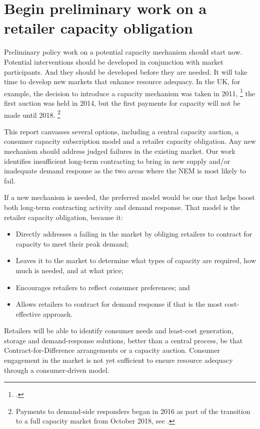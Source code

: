 \documentclass[FrontPage]{grattan}
\begin{document}
\section{Begin preliminary work on a retailer capacity obligation}\label{sec:the-preferred-model-a-retailer-capacity-obligation} 
Preliminary policy work on a potential capacity mechanism should start now. Potential interventions should be developed in conjunction with market participants. And they should be developed before they are needed. It will take time to develop new markets that enhance resource adequacy. In the UK, for example, the decision to introduce a capacity mechanism was taken in 2011,%
\footcite{UK2011DECCWhitePaper}
the first auction was held in 2014, but the first payments for capacity will not be made until 2018.%
\footnote{Payments to demand-side responders began in 2016 as part of the transition to a full capacity market from October 2018, see \textcite{Engie2016UKCapacityMarket}.}

This report canvasses several options, including a central capacity auction, a consumer capacity subscription model and a retailer capacity obligation. Any new mechanism should address judged failures in the existing market. Our work identifies insufficient long-term contracting to bring in new supply and/or inadequate demand response as the two areas where the NEM is most likely to fail. 

If a new mechanism is needed, the preferred model would be one that helps boost both long-term contracting activity and demand response. That model is the retailer capacity obligation, because it:
\begin{itemize}
    \item Directly addresses a failing in the market by obliging retailers to contract for capacity to meet their peak demand;
    \item Leaves it to the market to determine what types of capacity are required, how much is needed, and at what price; 
    \item Encourages retailers to reflect consumer preferences; and
    \item Allows retailers to contract for demand response if that is the most cost-effective approach.
\end{itemize}

Retailers will be able to identify consumer needs and least-cost generation, storage and demand-response solutions, better than a central process, be that Contract-for-Difference arrangements or a capacity auction. Consumer engagement in the market is not yet sufficient to ensure resource adequacy through a consumer-driven model.
\end{document}

